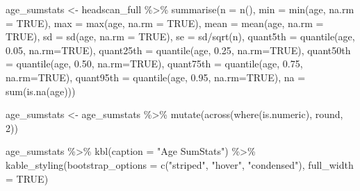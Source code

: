 \documentclass[
]{article}
\newenvironment{Shaded}{\begin{snugshade}}{\end{snugshade}}
\newcommand{\AttributeTok}[1]{\textcolor[rgb]{0.77,0.63,0.00}{#1}}
\newcommand{\ConstantTok}[1]{\textcolor[rgb]{0.00,0.00,0.00}{#1}}
\newcommand{\DecValTok}[1]{\textcolor[rgb]{0.00,0.00,0.81}{#1}}
\newcommand{\FloatTok}[1]{\textcolor[rgb]{0.00,0.00,0.81}{#1}}
\newcommand{\FunctionTok}[1]{\textcolor[rgb]{0.00,0.00,0.00}{#1}}
\newcommand{\NormalTok}[1]{#1}
\newcommand{\OtherTok}[1]{\textcolor[rgb]{0.56,0.35,0.01}{#1}}
\newcommand{\SpecialCharTok}[1]{\textcolor[rgb]{0.00,0.00,0.00}{#1}}
\newcommand{\StringTok}[1]{\textcolor[rgb]{0.31,0.60,0.02}{#1}}
\begin{document}
\begin{Shaded}
\begin{Highlighting}[]
\NormalTok{age\_sumstats }\OtherTok{\textless{}{-}}\NormalTok{ headscan\_full }\SpecialCharTok{\%\textgreater{}\%} 
  \FunctionTok{summarise}\NormalTok{(}\AttributeTok{n =} \FunctionTok{n}\NormalTok{(),}
            \AttributeTok{min =} \FunctionTok{min}\NormalTok{(age, }\AttributeTok{na.rm =} \ConstantTok{TRUE}\NormalTok{),}
            \AttributeTok{max =} \FunctionTok{max}\NormalTok{(age, }\AttributeTok{na.rm =} \ConstantTok{TRUE}\NormalTok{),}
            \AttributeTok{mean =} \FunctionTok{mean}\NormalTok{(age, }\AttributeTok{na.rm =} \ConstantTok{TRUE}\NormalTok{),}
            \AttributeTok{sd =} \FunctionTok{sd}\NormalTok{(age, }\AttributeTok{na.rm =} \ConstantTok{TRUE}\NormalTok{),}
            \AttributeTok{se =}\NormalTok{ sd}\SpecialCharTok{/}\FunctionTok{sqrt}\NormalTok{(n),}
            \AttributeTok{quant5th =} \FunctionTok{quantile}\NormalTok{(age, }\FloatTok{0.05}\NormalTok{, }\AttributeTok{na.rm=}\ConstantTok{TRUE}\NormalTok{),}
            \AttributeTok{quant25th =} \FunctionTok{quantile}\NormalTok{(age, }\FloatTok{0.25}\NormalTok{, }\AttributeTok{na.rm=}\ConstantTok{TRUE}\NormalTok{),}
            \AttributeTok{quant50th =} \FunctionTok{quantile}\NormalTok{(age, }\FloatTok{0.50}\NormalTok{, }\AttributeTok{na.rm=}\ConstantTok{TRUE}\NormalTok{),}
            \AttributeTok{quant75th =} \FunctionTok{quantile}\NormalTok{(age, }\FloatTok{0.75}\NormalTok{, }\AttributeTok{na.rm=}\ConstantTok{TRUE}\NormalTok{),}
            \AttributeTok{quant95th =} \FunctionTok{quantile}\NormalTok{(age, }\FloatTok{0.95}\NormalTok{, }\AttributeTok{na.rm=}\ConstantTok{TRUE}\NormalTok{),}
            \AttributeTok{na =} \FunctionTok{sum}\NormalTok{(}\FunctionTok{is.na}\NormalTok{(age)))}

\NormalTok{age\_sumstats }\OtherTok{\textless{}{-}}\NormalTok{ age\_sumstats }\SpecialCharTok{\%\textgreater{}\%} 
  \FunctionTok{mutate}\NormalTok{(}\FunctionTok{across}\NormalTok{(}\FunctionTok{where}\NormalTok{(is.numeric), round, }\DecValTok{2}\NormalTok{))}
            
\NormalTok{age\_sumstats }\SpecialCharTok{\%\textgreater{}\%} 
  \FunctionTok{kbl}\NormalTok{(}\AttributeTok{caption =} \StringTok{"Age SumStats"}\NormalTok{) }\SpecialCharTok{\%\textgreater{}\%} 
  \FunctionTok{kable\_styling}\NormalTok{(}\AttributeTok{bootstrap\_options =} \FunctionTok{c}\NormalTok{(}\StringTok{"striped"}\NormalTok{, }\StringTok{"hover"}\NormalTok{, }\StringTok{"condensed"}\NormalTok{), }\AttributeTok{full\_width =} \ConstantTok{TRUE}\NormalTok{)}
\end{Highlighting}
\end{Shaded}
\end{document}

